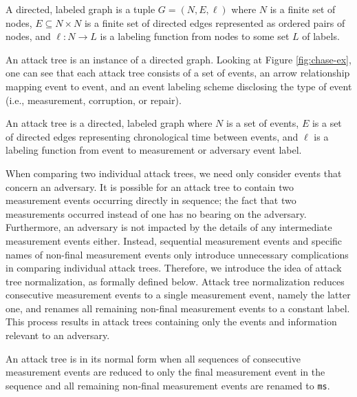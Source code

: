 \documentclass[runningheads]{llncs}
\theoremstyle{definition}
\begin{document}
\begin{definition}[Graph]
    A directed, labeled graph is a tuple $G = (N, E, \ell)$ where $N$ is a finite set of nodes, $E \subseteq N \times N$ is a finite set of directed edges represented as ordered pairs of nodes, and $\ell : N \rightarrow L$ is a labeling function from nodes to some set $L$ of labels. 
\end{definition} 
 
An attack tree is an instance of a directed graph. Looking at Figure \ref{fig:chase-ex}, one can see that each attack tree consists of a set of events, an arrow relationship mapping event to event, and an event labeling scheme disclosing the type of event (i.e., measurement, corruption, or repair).

\begin{definition}
    An attack tree is a directed, labeled graph where $N$ is a set of events, $E$ is a set of directed edges representing chronological time between events, and $\ell$ is a labeling function from event to measurement or adversary event label.
\end{definition}

When comparing two individual attack trees, we need only consider
events that concern an adversary. It is possible for an attack tree to
contain two measurement events occurring directly in sequence; the
fact that two measurements occurred instead of one has no bearing on
the adversary. Furthermore, an adversary is not impacted by the
details of any intermediate measurement events either. Instead,
sequential measurement events and specific names of non-final
measurement events only introduce unnecessary complications in
comparing individual attack trees. Therefore, we introduce the idea of
attack tree normalization, as formally defined below. Attack tree
normalization reduces consecutive measurement events to a single
measurement event, namely the latter one, and renames all remaining
non-final measurement events to a constant label. This process results
in attack trees containing only the events and information relevant to
an adversary.  


\begin{definition}
    An attack tree is in its normal form when all sequences of consecutive measurement events are reduced to only the final measurement event in the sequence and all remaining non-final measurement events are renamed to \texttt{ms}. 
\end{definition}
\end{document}
